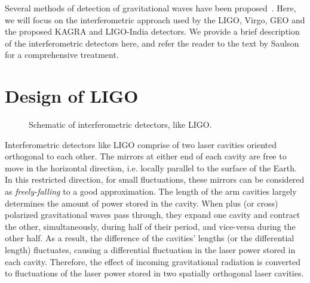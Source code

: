 
Several methods of detection of gravitational waves have been 
proposed~\cite{PhysRevLett.20.1307,PhysRevD.54.1264,1978SvA....22...36S,
1979ApJ...234.1100D}. Here, we will focus on the interferometric approach
used by the LIGO, Virgo, GEO and the proposed KAGRA
and LIGO-India detectors. We provide a brief description of the interferometric
detectors here, and refer the reader to the text by 
Saulson~\cite{Saulson:1995zi} for a comprehensive treatment.

\section{Design of LIGO}\label{sec:ligo_construction}
\begin{figure}
 \begin{center}
 \end{center}
\caption{\label{fig:ligo}Schematic of interferometric detectors, like LIGO.}
\end{figure}
%
Interferometric detectors like LIGO comprise of two laser cavities oriented 
orthogonal to each other. The mirrors at either end of each cavity are free to move 
in the horizontal direction, i.e. locally parallel to the surface of the Earth. 
In this restricted direction, for small fluctuations, these mirrors can be
considered as {\it freely-falling} to a good approximation.
The length of the arm cavities largely determines the amount of power stored
in the cavity. 
%
When plus (or cross) polarized gravitational waves pass through, they expand 
one cavity and contract the other, simultaneously, during half of their period,
and vice-versa during the other half. As a result, the difference of the cavities'
lengths (or the differential length) fluctuates, causing a differential fluctuation
in the laser power stored in each cavity. 
% 
Therefore, the effect of incoming gravitational radiation is converted to 
fluctuations of the laser power stored in two spatially orthogonal laser cavities.

